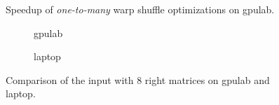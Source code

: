 \begin{figure}[ht]
	\centering	
	\begin{subfigure}{0.4\textwidth}
		\centering
		\def\svgwidth{\textwidth}
		
	\end{subfigure}
	\begin{subfigure}{0.4\textwidth}
		\centering
		\def\svgwidth{\textwidth}
		
	\end{subfigure}
	\hfill
	\begin{subfigure}{0.4\textwidth}
		\centering
		\def\svgwidth{\textwidth}
		
	\end{subfigure}
	\begin{subfigure}{0.4\textwidth}
		\centering
		\def\svgwidth{\textwidth}
		
	\end{subfigure}
	
	\caption{Speedup of \textit{one-to-many} warp shuffle optimizations on gpulab.}
	\label{fig:warp_shuffle_one_to_many_results}
\end{figure}

\begin{figure}[ht]
	\centering	
	\begin{subfigure}{0.4\textwidth}
		\centering
		\def\svgwidth{\textwidth}
		
		\caption{gpulab}
		\label{fig:warp_shuffle_one_to_many_results_gpulab}
	\end{subfigure}
	\begin{subfigure}{0.4\textwidth}
		\centering
		\def\svgwidth{\textwidth}
		
		\caption{laptop}
		\label{fig:warp_shuffle_one_to_many_results_laptop}
	\end{subfigure}
	
	\caption{Comparison of the input with 8 right matrices on gpulab and laptop.}
	\label{fig:warp_shuffle_one_to_many_results_gpulab_vs_laptop}
\end{figure}

